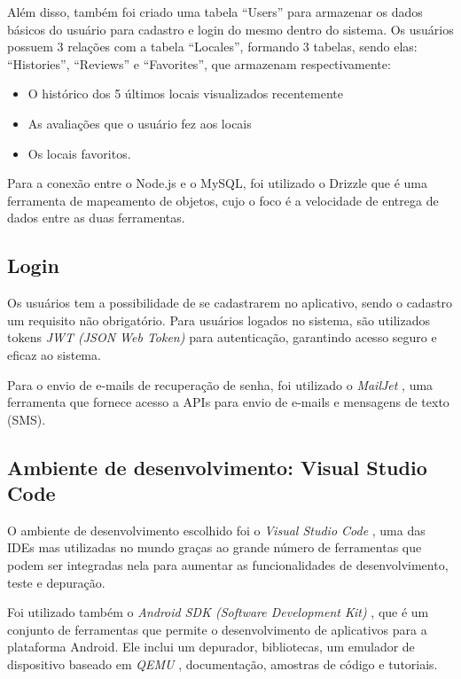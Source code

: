     Além disso, também foi criado uma tabela ``Users'' para armazenar os dados básicos do usuário para cadastro e login do mesmo dentro do sistema. Os usuários possuem 3 relações com a tabela ``Locales'', formando 3 tabelas, sendo elas: ``Histories'', ``Reviews'' e ``Favorites'', que armazenam respectivamente:
    
    \begin{itemize}
        \item O histórico dos 5 últimos locais visualizados recentemente
        \item As avaliações que o usuário fez aos locais 
        \item Os locais favoritos.
    \end{itemize}

    Para a conexão entre o Node.js e o MySQL, foi utilizado o Drizzle que é uma ferramenta de mapeamento de objetos, cujo o foco é a velocidade de entrega de dados entre as duas ferramentas.

\subsection{Login}
    Os usuários tem a possibilidade de se cadastrarem no aplicativo, sendo o cadastro um requisito não obrigatório. Para usuários logados no sistema, são utilizados tokens \textit{JWT (JSON Web Token)} \cite{jwt} para autenticação, garantindo acesso seguro e eficaz ao sistema.
    
    Para o envio de e-mails de recuperação de senha, foi utilizado o \textit{MailJet} \cite{mailjet}, uma ferramenta que fornece acesso a APIs para envio de e-mails e mensagens de texto (SMS).

\subsection{Ambiente de desenvolvimento: Visual Studio Code}
    O ambiente de desenvolvimento escolhido foi o \textit{Visual Studio Code} \cite{visualstudiocode}, uma das IDEs mas utilizadas no mundo graças ao grande número de ferramentas que podem ser integradas nela para aumentar as funcionalidades de desenvolvimento, teste e depuração.
    
    Foi utilizado também o \textit{Android SDK (Software Development Kit)} \cite{androidsdk}, que é um conjunto de ferramentas que permite o desenvolvimento de aplicativos para a plataforma Android. Ele inclui um depurador, bibliotecas, um emulador de dispositivo baseado em \textit{QEMU} \cite{QEMU}, documentação, amostras de código e tutoriais.
    
